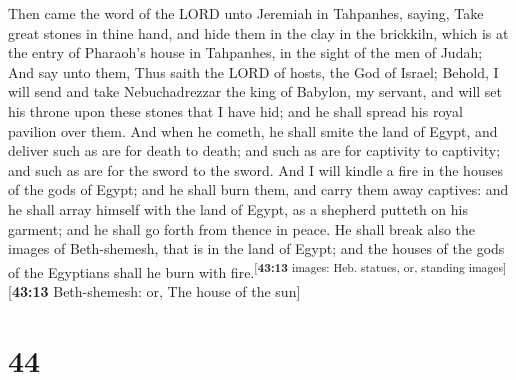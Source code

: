  Then came the word of the LORD unto Jeremiah in
Tahpanhes, saying,  Take great stones in thine hand, and
hide them in the clay in the brickkiln, which is at the entry of
Pharaoh's house in Tahpanhes, in the sight of the men of Judah;
 And say unto them, Thus saith the LORD of hosts, the God
of Israel; Behold, I will send and take Nebuchadrezzar the king of
Babylon, my servant, and will set his throne upon these stones that I
have hid; and he shall spread his royal pavilion over them.
 And when he cometh, he shall smite the land of Egypt,
and deliver such as are for death to death; and such as are for
captivity to captivity; and such as are for the sword to the sword.
 And I will kindle a fire in the houses of the gods of
Egypt; and he shall burn them, and carry them away captives: and he
shall array himself with the land of Egypt, as a shepherd putteth on his
garment; and he shall go forth from thence in peace.  He
shall break also the images of Beth-shemesh, that is in the land of
Egypt; and the houses of the gods of the Egyptians shall he burn with
fire.\textsuperscript{{[}\textbf{43:13} images: Heb. statues, or,
standing images{]}}{[}\textbf{43:13} Beth-shemesh: or, The house of the
sun{]}

\hypertarget{section-43}{%
\section{44}\label{section-43}}

